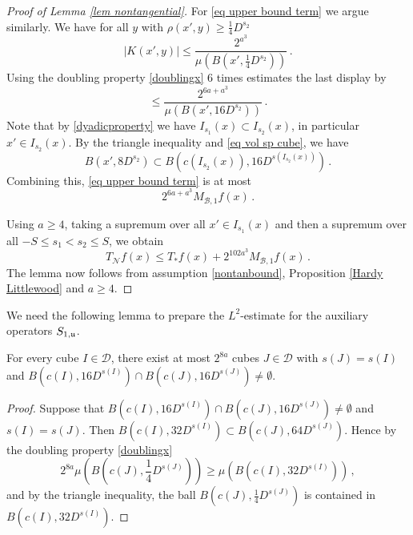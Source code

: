 {\begin{proof}[Proof of Lemma \ref{lem nontangential}]
    For \eqref{eq upper bound term} we argue similarly. We have for all $y$ with $\rho(x', y) \ge \frac{1}{4}D^{s_2}$
    $$
        |K(x', y)| \le \frac{2^{a^3}}{\mu(B(x', \frac{1}{4}D^{s_2}))}\,.
    $$
    Using the doubling property \eqref{doublingx} $6$ times estimates
    the last display by
    \begin{equation}
        \le \frac{2^{6a + a^3}}{\mu(B(x',  16 D^{s_2}))}\, .
    \end{equation}
    Note that by \eqref{dyadicproperty} we have $I_{s_1}(x) \subset I_{s_2}(x)$, in particular $x' \in I_{s_2}(x)$.
    By the triangle inequality and \eqref{eq vol sp cube}, we have
    $$
        B(x', 8D^{s_2}) \subset B(c(I_{s_2}(x)), 16D^{s(I_{s_2}(x))})\,.
    $$
    Combining this, \eqref{eq upper bound term} is at most
    $$
        2^{6a+a^3} M_{\mathcal{B},1} f(x)\,.
    $$

    Using $a \ge 4$, taking a supremum over all $x' \in I_{s_1}(x)$ and then a supremum over all $-S \le s_1 < s_2 \le S$, we obtain
    $$
        T_{\mathcal{N}} f(x) \le T_*f(x) + 2^{102a^3}  M_{\mathcal{B},1} f(x)\,.
    $$
    The lemma now follows from assumption \eqref{nontanbound}, Proposition \ref{Hardy Littlewood} and $a \ge 4$.
\end{proof}

We need the following lemma to prepare the $L^2$-estimate for the auxiliary operators $S_{1, \mathfrak u}$.

\begin{lemma}
    \label{lem aux overlap}
    For every cube $I \in \mathcal{D}$, there exist at most $2^{8a}$ cubes $J \in \mathcal{D}$ with $s(J) = s(I)$ and $B(c(I), 16D^{s(I)}) \cap B(c(J), 16 D^{s(J)}) \ne \emptyset$.
\end{lemma}

\begin{proof}
    Suppose that $B(c(I), 16 D^{s(I)}) \cap B(c(J), 16 D^{s(J)}) \ne \emptyset$ and $s(I) = s(J)$. Then $B(c(I), 32 D^{s(I)}) \subset B(c(J), 64 D^{s(J)})$. Hence by the doubling property \eqref{doublingx}
    $$
        2^{8a}\mu(B(c(J), \frac{1}{4}D^{s(J)})) \ge \mu(B(c(I), 32 D^{s(I)}))\,,
    $$
    and by the triangle inequality, the ball $B(c(J), \frac{1}{4}D^{s(J)})$ is contained in $B(c(I), 32 D^{s(I)})$.


\end{proof}}
